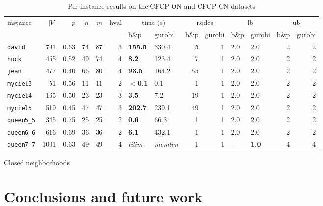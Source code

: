 \documentclass[preprint, 11pt, authoryear]{elsarticle}
\begin{document}
\begin{table}[]
\begin{subtable}{\textwidth}
\centering
\footnotesize
\setlength{\tabcolsep}{5pt}
\begin{tabular}{lrrrrrllrrllrr}
\toprule
instance & $|V|$ & $p$ & $n$ & $m$ & hval & \multicolumn{2}{c}{time (s)} & \multicolumn{2}{c}{nodes} & \multicolumn{2}{c}{lb} & \multicolumn{2}{c}{ub} \\
\cmidrule(lr){7-8} \cmidrule(lr){9-10} \cmidrule(lr){11-12} \cmidrule(lr){13-14}
 &  &  &  &  &  & b\&p & gurobi & b\&p & gurobi & b\&p & gurobi & b\&p & gurobi \\
\midrule
\texttt{david} & 791 & 0.63 & 74 & 87 & 3 & \textbf{155.5} & 330.4 & 5 & 1 & 2.0 & 2.0 & 2 & 2 \\
\texttt{huck} & 455 & 0.52 & 49 & 74 & 4 & \textbf{8.2} & 123.4 & 7 & 1 & 2.0 & 2.0 & 2 & 2 \\
\texttt{jean} & 477 & 0.40 & 66 & 80 & 4 & \textbf{93.5} & 164.2 & 55 & 1 & 2.0 & 2.0 & 2 & 2 \\
\texttt{myciel3} & 51 & 0.56 & 11 & 11 & 2 & $<$\textbf{0.1} & 0.1 & 1 & 1 & 2.0 & 2.0 & 2 & 2 \\
\texttt{myciel4} & 165 & 0.50 & 23 & 23 & 3 & \textbf{3.5} & 7.2 & 19 & 1 & 2.0 & 2.0 & 2 & 2 \\
\texttt{myciel5} & 519 & 0.45 & 47 & 47 & 3 & \textbf{202.7} & 239.1 & 49 & 1 & 2.0 & 2.0 & 2 & 2 \\
\texttt{queen5\_5} & 345 & 0.75 & 25 & 25 & 2 & \textbf{0.6} & 66.3 & 1 & 1 & 2.0 & 2.0 & 2 & 2 \\
\texttt{queen6\_6} & 616 & 0.69 & 36 & 36 & 2 & \textbf{6.1} & 432.1 & 1 & 1 & 2.0 & 2.0 & 2 & 2 \\
\texttt{queen7\_7} & 1001 & 0.63 & 49 & 49 & 4 & \textit{tilim} & \textit{memlim} & 1 & 1 & -- & \textbf{1.0} & 4 & 4 \\
\bottomrule
\end{tabular}
\caption{Closed neighborhoods}
\label{table.results.closed.neighborhoods}
\end{subtable}

\caption{Per-instance results on the CFCP-ON and CFCP-CN datasets}

\end{table}


\section{Conclusions and future work}
\label{sec:conclusions}
\end{document}
